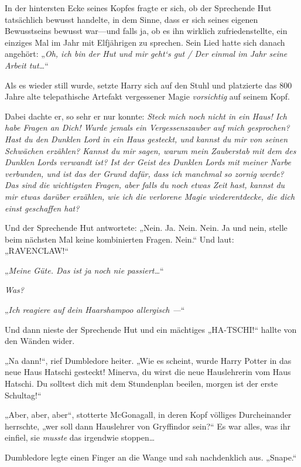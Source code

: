 \later

In der hintersten Ecke seines Kopfes fragte er sich, ob der Sprechende Hut tatsächlich bewusst handelte, in dem Sinne, dass er sich seines eigenen Bewusstseins bewusst war—und falls ja, ob es ihn wirklich zufriedenstellte, ein einziges Mal im Jahr mit Elfjährigen zu sprechen. Sein Lied hatte sich danach angehört: „\emph{Oh, ich bin der Hut und mir geht‘s gut / Der einmal im Jahr seine Arbeit tut…}“

Als es wieder still wurde, setzte Harry sich auf den Stuhl und platzierte das 800 Jahre alte telepathische Artefakt vergessener Magie \emph{vorsichtig} auf seinem Kopf.

Dabei dachte er, so sehr er nur konnte: \emph{Steck mich noch nicht in ein Haus! Ich habe Fragen an Dich! Wurde jemals ein Vergessenszauber auf mich gesprochen? Hast du den Dunklen Lord in ein Haus gesteckt, und kannst du mir von seinen Schwächen erzählen? Kannst du mir sagen, warum mein Zauberstab mit dem des Dunklen Lords verwandt ist? Ist der Geist des Dunklen Lords mit meiner Narbe verbunden, und ist das der Grund dafür, dass ich manchmal so zornig werde? Das sind die wichtigsten Fragen, aber falls du noch etwas Zeit hast, kannst du mir etwas darüber erzählen, wie ich die verlorene Magie wiederentdecke, die dich einst geschaffen hat?}

Und der Sprechende Hut antwortete: „Nein. Ja. Nein. Nein. Ja und nein, stelle beim nächsten Mal keine kombinierten Fragen. Nein.“ Und laut: „RAVENCLAW!“

\later

„\emph{Meine Güte. Das ist ja noch nie passiert…}“

\emph{Was?}

„\emph{Ich reagiere auf dein Haarshampoo allergisch —}“

Und dann nieste der Sprechende Hut und ein mächtiges „HA-TSCHI!“ hallte von den Wänden wider.

„Na dann!“, rief Dumbledore heiter. „Wie es scheint, wurde Harry Potter in das neue Haus Hatschi gesteckt! Minerva, du wirst die neue Hauslehrerin vom Haus Hatschi. Du solltest dich mit dem Stundenplan beeilen, morgen ist der erste Schultag!“

„Aber, aber, aber“, stotterte McGonagall, in deren Kopf völliges Durcheinander herrschte, „wer soll dann Hauslehrer von Gryffindor sein?“ Es war alles, was ihr einfiel, sie \emph{musste} das irgendwie stoppen…

Dumbledore legte einen Finger an die Wange und sah nachdenklich aus. „Snape.“

